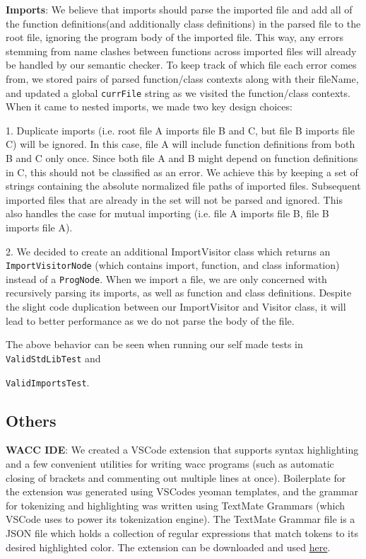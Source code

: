 \documentclass[11pt,a4paper]{article}
\newcommand{\cmd}[1]{\texttt{#1}}
\begin{document}
\noindent \textbf{Imports}: We believe that imports should parse the imported file and add all of the function definitions(and additionally class definitions) in the parsed file to the root file, ignoring the program body of the imported file. This way, any errors stemming from name clashes between functions across imported files will already be handled by our semantic checker. To keep track of which file each error comes from, we stored pairs of parsed function/class contexts along with their fileName, and updated a global \cmd{currFile} string as we visited the function/class contexts. When it came to nested imports, we made two key design choices:

1. Duplicate imports (i.e. root file A imports file B and C, but file B imports file C) will be ignored. In this case, file A will include function definitions from both B and C only once. Since both file A and B might depend on function definitions in C, this should not be classified as an error. We achieve this by keeping a set of strings containing the absolute normalized file paths of imported files. Subsequent imported files that are already in the set will not be parsed and ignored. This also handles the case for mutual importing (i.e. file A imports file B, file B imports file A). 

2. We decided to create an additional ImportVisitor class which returns an \cmd{ImportVisitorNode} (which contains import, function, and class information) instead of a \cmd{ProgNode}. When we import a file, we are only concerned with recursively parsing its imports, as well as function and class definitions. Despite the slight code duplication between our ImportVisitor and Visitor class, it will lead to better performance as we do not parse the body of the file. 

The above behavior can be seen when running our self made tests in \cmd{ValidStdLibTest} and 

\noindent \cmd{ValidImportsTest}.

\subsection{Others}
\noindent \textbf{WACC IDE}: We created a VSCode extension that supports syntax highlighting and a few convenient utilities for writing wacc programs (such as automatic closing of brackets and commenting out multiple lines at once). Boilerplate for the extension was generated using VSCodes yeoman templates, and the grammar for tokenizing and highlighting was written using TextMate Grammars (which VSCode uses to power its tokenization engine). The TextMate Grammar file is a JSON file which holds a collection of regular expressions that match tokens to its desired highlighted color. The extension can be downloaded and used 
\href{https://marketplace.visualstudio.com/items?itemName=2021-wacc-22.wacc-language}{here}.
\end{document}
